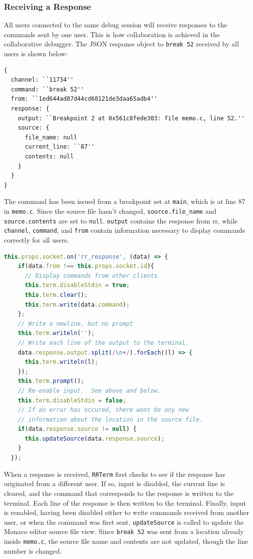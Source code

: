 \documentclass[12pt]{article}
\begin{document}
\subsubsection{Receiving a Response}

All users connected to the same debug session will receive responses
to the commands sent by one user.  This is how collaboration is
achieved in the collaborative debugger.  The JSON response object to
\lstinline{break 52} received by all users is shown below:

\begin{lstlisting}[basicstyle=\linespread{0.5}\ttfamily,caption={JSON Response},captionpos=b]
{
  channel: ``11734''
  command: ``break 52''
  from: ``1ed644ad87d44cd68121de3daa65adb4''
  response: {
    output: ``Breakpoint 2 at 0x561c8fede303: file memo.c, line 52.''
    source: {
      file_name: null
      current_line: ``87''
      contents: null
    }
  }
}
\end{lstlisting}

The command has been issued from a breakpoint set at \lstinline{main},
which is at line 87 in \lstinline{memo.c}.  Since the source file
hasn't changed, \lstinline{source.file_name} and
\lstinline{source.contents} are set to \lstinline{null}.
\lstinline{output} contains the response from rr, while
\lstinline{channel}, \lstinline{command}, and \lstinline{from} contain
information necessary to display commands correctly for all users.

\begin{lstlisting}[language=Javascript,basicstyle=\linespread{0.5}\ttfamily,caption={Processing a Response},captionpos=b]
  this.props.socket.on('rr_response', (data) => {
    if(data.from !== this.props.socket.id){
      // Display commands from other clients
      this.term.disableStdin = true;
      this.term.clear();
      this.term.write(data.command);
    };
    // Write a newline, but no prompt
    this.term.writeln('');
    // Write each line of the output to the terminal
    data.response.output.split(/\n+/).forEach((l) => {
      this.term.writeln(l);
    });
    this.term.prompt();
    // Re-enable input.  See above and below.
    this.term.disableStdin = false;
    // If an error has occured, there wont be any new
    // information about the location in the source file.
    if(data.response.source != null) {
      this.updateSource(data.response.source);
    }
  });
\end{lstlisting}

When a response is received, \lstinline{RRTerm} first checks to see if
the response has originated from a different user.  If so, input is
disabled, the current line is cleared, and the command that
corresponds to the response is written to the terminal.  Each line of
the response is then written to the terminal.  Finally, input is
renabled, having been disabled either to write commands received from
another user, or when the command was first sent.
\lstinline{updateSource} is called to update the Monaco editor source
file view.  Since \lstinline{break 52} was sent from a location
already inside \lstinline{memo.c}, the source file name and contents
are not updated, though the line number is changed.
\end{document}
